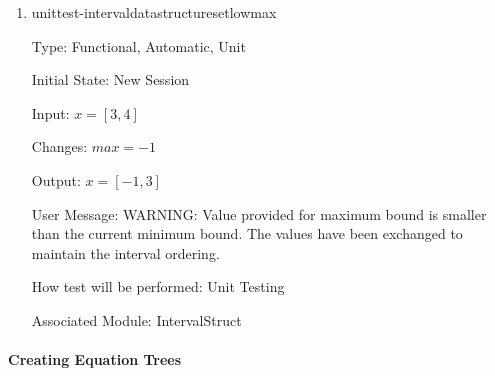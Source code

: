 \documentclass[12pt, titlepage]{article}
\begin{document}
\begin{enumerate}
	\item{unittest-intervaldatastructuresetlowmax}
	
	Type: Functional, Automatic, Unit
	
	Initial State: New Session
	
	Input: $x = [3,4]$
	
	Changes: $max = -1$
	
	Output: $x = [-1,3]$
	
	User Message: WARNING: Value provided for maximum bound is smaller than the 
	current minimum bound. The values have been exchanged to maintain the 
	interval ordering.
	
	How test will be performed: Unit Testing
	
	Associated Module: IntervalStruct\\
	
\end{enumerate}

\paragraph{Creating Equation Trees}
\end{document}
